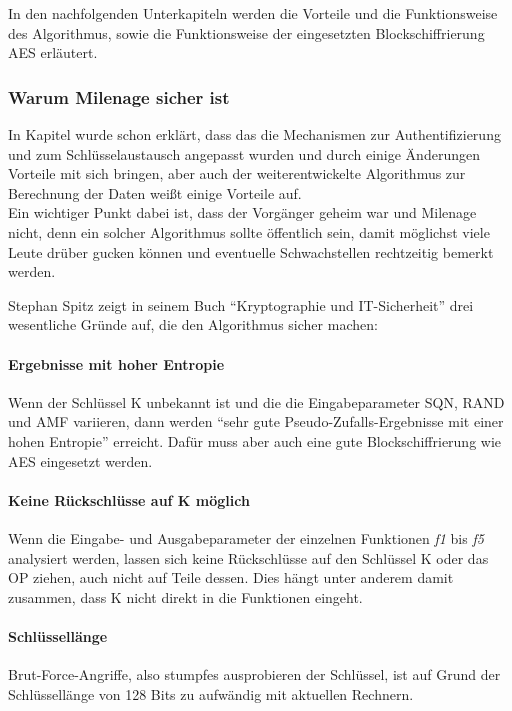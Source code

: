 In den nachfolgenden Unterkapiteln werden die Vorteile und die Funktionsweise des Algorithmus, sowie die Funktionsweise der eingesetzten Blockschiffrierung \ac{AES} erläutert.

 \subsubsection{Warum Milenage sicher ist}
 In Kapitel  wurde schon erklärt, dass das die Mechanismen zur Authentifizierung und zum Schlüsselaustausch angepasst wurden und durch einige Änderungen Vorteile mit sich bringen, aber auch der weiterentwickelte Algorithmus zur Berechnung der Daten weißt einige Vorteile auf. \\
 Ein wichtiger Punkt dabei ist, dass der Vorgänger geheim war und Milenage nicht, denn ein solcher Algorithmus sollte öffentlich sein, damit möglichst viele Leute drüber gucken können und eventuelle Schwachstellen rechtzeitig bemerkt werden. 
 
 Stephan Spitz zeigt in seinem Buch ``Kryptographie und IT-Sicherheit''  \cite{spitz11} drei wesentliche Gründe auf, die den Algorithmus sicher machen:
 
 \paragraph{Ergebnisse mit hoher Entropie}
 Wenn der Schlüssel \ac{K} unbekannt ist und die die Eingabeparameter \ac{SQN}, \ac{RAND} und \ac{AMF} variieren, dann werden ``sehr gute Pseudo-Zufalls-Ergebnisse mit einer hohen Entropie'' \cite{spitz11} erreicht. Dafür muss aber auch eine gute Blockschiffrierung wie AES eingesetzt werden.
 
 \paragraph{Keine Rückschlüsse auf K möglich}
 Wenn die Eingabe- und Ausgabeparameter der einzelnen Funktionen \emph{f1} bis \emph{f5} analysiert werden, lassen sich keine Rückschlüsse auf den Schlüssel K oder das \acf{OP} ziehen, auch nicht auf Teile dessen. Dies hängt unter anderem damit zusammen, dass K nicht direkt in die Funktionen eingeht.
 
 \paragraph{Schlüssellänge}
 Brut-Force-Angriffe, also stumpfes ausprobieren der Schlüssel, ist auf Grund der Schlüssellänge von 128 Bits zu aufwändig mit aktuellen Rechnern.
 
